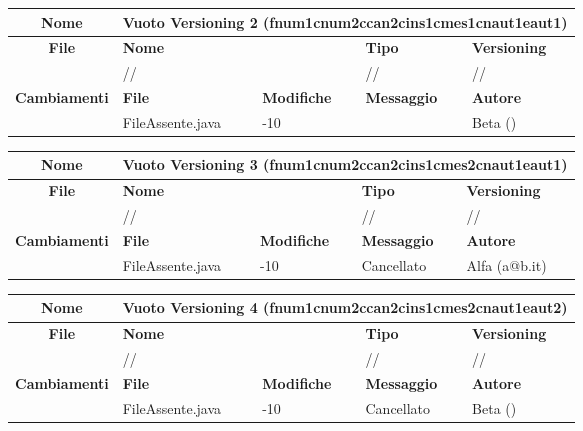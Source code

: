 \begin{table}[ht]
\footnotesize
\begin{tabular}{|c|p{2.5cm}|p{2cm}|p{2.5cm}|p{2.5cm}|}
  \hline
  \textbf{Nome}	& \multicolumn{4}{l|}{Vuoto Versioning 2 (fnum1cnum2ccan2cins1cmes1cnaut1eaut1)} 							\\
  \hline
  \rowcolor{lightgray}\textbf{File} 		& \multicolumn{2}{l|}{\textbf{Nome}}		& \textbf{Tipo}		& \textbf{Versioning} 		\\
						\cline{2-5}
						& \multicolumn{2}{l|}{//}			& //			& //				\\
  \hline
  \rowcolor{lightgray}\textbf{Cambiamenti}	& \textbf{File}		&\textbf{Modifiche}	& \textbf{Messaggio}	& \textbf{Autore}		\\
						\cline{2-5}
						& FileAssente.java	& -10	  		& 			& Beta ()			\\
  \hline
\end{tabular}
\end{table}

\begin{table}[ht]
\footnotesize
\begin{tabular}{|c|p{2.5cm}|p{2cm}|p{2.5cm}|p{2.5cm}|}
  \hline
  \textbf{Nome}	& \multicolumn{4}{l|}{Vuoto Versioning 3 (fnum1cnum2ccan2cins1cmes2cnaut1eaut1)} 							\\
  \hline
  \rowcolor{lightgray}\textbf{File} 		& \multicolumn{2}{l|}{\textbf{Nome}}		& \textbf{Tipo}		& \textbf{Versioning} 		\\
						\cline{2-5}
						& \multicolumn{2}{l|}{//}			& //			& //				\\
  \hline
  \rowcolor{lightgray}\textbf{Cambiamenti}	& \textbf{File}		&\textbf{Modifiche}	& \textbf{Messaggio}	& \textbf{Autore}		\\
						\cline{2-5}
						& FileAssente.java	& -10	  		& Cancellato		& Alfa (a@b.it)		\\
  \hline
\end{tabular}
\end{table}

\begin{table}[ht]
\footnotesize
\begin{tabular}{|c|p{2.5cm}|p{2cm}|p{2.5cm}|p{2.5cm}|}
  \hline
  \textbf{Nome}	& \multicolumn{4}{l|}{Vuoto Versioning 4 (fnum1cnum2ccan2cins1cmes2cnaut1eaut2)} 							\\
  \hline
  \rowcolor{lightgray}\textbf{File} 		& \multicolumn{2}{l|}{\textbf{Nome}}		& \textbf{Tipo}		& \textbf{Versioning} 		\\
						\cline{2-5}
						& \multicolumn{2}{l|}{//}			& //			& //				\\
  \hline
  \rowcolor{lightgray}\textbf{Cambiamenti}	& \textbf{File}		&\textbf{Modifiche}	& \textbf{Messaggio}	& \textbf{Autore}		\\
						\cline{2-5}
						& FileAssente.java	& -10	  		& Cancellato		& Beta ()			\\
  \hline
\end{tabular}
\end{table}




